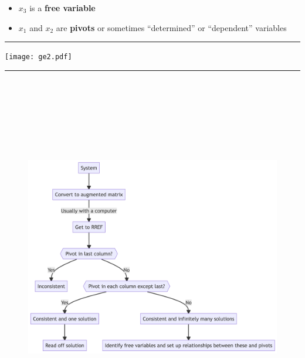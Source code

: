 \documentclass[
  letterpaper,
  DIV=11,
  numbers=noendperiod]{scrartcl}
\providecommand{\tightlist}{%
  \setlength{\itemsep}{0pt}\setlength{\parskip}{0pt}}\usepackage{longtable,booktabs,array}
\begin{document}
\begin{itemize}
\tightlist
\item
  \(x_3\) is a \textbf{free variable}
\item
  \(x_1\) and \(x_2\) are \textbf{pivots} or sometimes ``determined'' or
  ``dependent'' variables
\end{itemize}

\begin{center}\rule{0.5\linewidth}{0.5pt}\end{center}

\texttt{[image: ge2.pdf]}

\begin{center}\rule{0.5\linewidth}{0.5pt}\end{center}

\begin{figure}[H]

{\centering \includegraphics[width=8.12in,height=6.31in]{302-linearsystems_files/figure-latex/mermaid-figure-1.png}

}

\end{figure}
\end{document}
